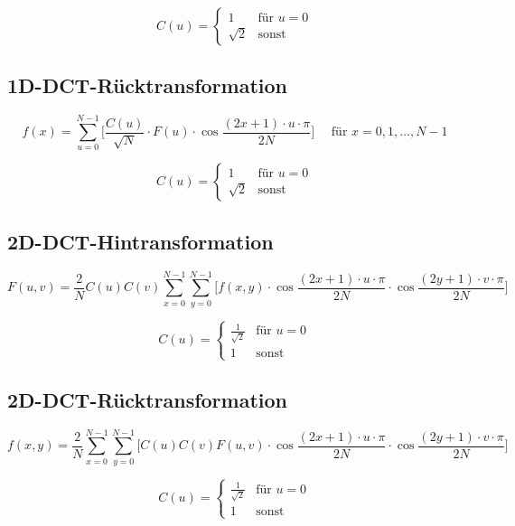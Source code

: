 \[
    C(u) = \begin{cases}
        1 & \text{für } u=0\\
        \sqrt{2} & \text{sonst}
    \end{cases}
\]

\subsection*{1D-DCT-Rücktransformation}
\[
    f(x) = \sum_{u=0}^{N-1} \bigg[ \frac{C(u)}{\sqrt{N}}
	\cdot F(u)
	\cdot \cos{\frac{(2x+1) \cdot u \cdot \pi{}}{2N}}
	\bigg] \quad \mbox{ für } x=0,1,\ldots,N-1
\]
	
\[
    C(u) = \begin{cases}
        1 & \text{für } u=0\\
        \sqrt{2} & \text{sonst}
    \end{cases}
\]

\subsection*{2D-DCT-Hintransformation}
\[
    F(u, v) = \frac{2}{N} C(u) C(v) \sum_{x=0}^{N-1} \sum_{y=0}^{N-1} \bigg[ f(x, y) \cdot 
    \cos \frac{(2x + 1) \cdot u \cdot \pi}{2 N} \cdot \cos \frac{(2y + 1) \cdot v \cdot \pi}{2 N} \bigg]
\]
	
\[
    C(u) = \begin{cases}
        \frac{1}{\sqrt{2}} & \text{für } u=0\\
        1 & \text{sonst}
    \end{cases}
\]

\subsection*{2D-DCT-Rücktransformation}
\[
    f(x, y) = \frac{2}{N} \sum_{x=0}^{N-1} \sum_{y=0}^{N-1} \bigg[ C(u) C(v) F(u, v) \cdot 
    \cos \frac{(2x + 1) \cdot u \cdot \pi}{2 N} \cdot \cos \frac{(2y + 1) \cdot v \cdot \pi}{2 N} \bigg]
\]
	
\[
    C(u) = \begin{cases}
        \frac{1}{\sqrt{2}} & \text{für } u=0\\
        1 & \text{sonst}
    \end{cases}
\]

